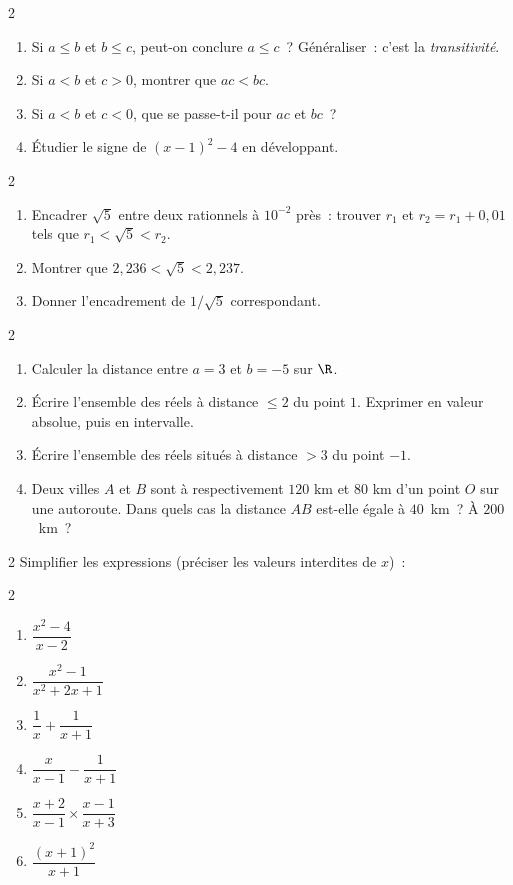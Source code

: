 \begin{exo}{2}
\begin{enumerate}
  \item Si $a \leq b$ et $b \leq c$, peut-on conclure $a \leq c$~?
        G\'en\'eraliser~: c'est la \emph{transitivit\'e}.
  \item Si $a < b$ et $c > 0$, montrer que $ac < bc$.
  \item Si $a < b$ et $c < 0$, que se passe-t-il pour $ac$ et $bc$~?
  \item \'Etudier le signe de $(x-1)^2 - 4$ en d\'eveloppant.
\end{enumerate}
\end{exo}

\begin{exo}{2}
\begin{enumerate}
  \item Encadrer $\sqrt{5}$ entre deux rationnels \`a $10^{-2}$ pr\`es~:
        trouver $r_1$ et $r_2 = r_1 + 0{,}01$ tels que $r_1 < \sqrt{5} < r_2$.
  \item Montrer que $2{,}236 < \sqrt{5} < 2{,}237$.
  \item Donner l'encadrement de $1/\sqrt{5}$ correspondant.
\end{enumerate}
\end{exo}

\begin{exo}{2}
\begin{enumerate}
  \item Calculer la distance entre $a=3$ et $b=-5$ sur $\R$.
  \item \'Ecrire l'ensemble des r\'eels \`a distance $\leq 2$ du point $1$.
        Exprimer en valeur absolue, puis en intervalle.
  \item \'Ecrire l'ensemble des r\'eels situ\'es \`a distance $>3$ du point $-1$.
  \item Deux villes $A$ et $B$ sont \`a respectivement $120$ km et $80$ km
        d'un point $O$ sur une autoroute.
        Dans quels cas la distance $AB$ est-elle \'egale \`a $40$~km~?
        \`A $200$~km~?
\end{enumerate}
\end{exo}

\begin{exo}{2}
Simplifier les expressions (pr\'eciser les valeurs interdites de $x$)~:
\begin{multicols}{2}
\begin{enumerate}
  \item $\dfrac{x^2-4}{x-2}$
  \item $\dfrac{x^2-1}{x^2+2x+1}$
  \item $\dfrac{1}{x} + \dfrac{1}{x+1}$
  \item $\dfrac{x}{x-1} - \dfrac{1}{x+1}$
  \item $\dfrac{x+2}{x-1} \times \dfrac{x-1}{x+3}$
  \item $\dfrac{(x+1)^2}{x+1}$
\end{enumerate}
\end{multicols}
\end{exo}

